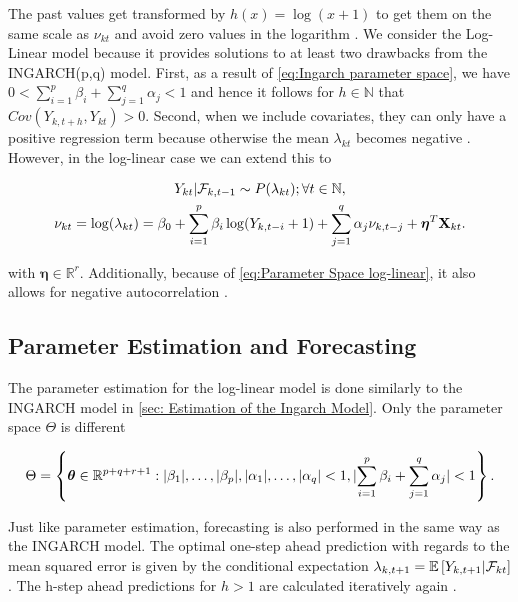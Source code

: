 The past values get transformed by $h(x)=\log(x+1)$ to get them on the same scale as $\nu_{kt}$ and avoid zero values in the logarithm \cite{Liboschik:2016,Fokianos:2011}. We consider the Log-Linear model because it provides solutions to at least two drawbacks from the INGARCH(p,q) model. First, as a result of \ref{eq:Ingarch parameter space}, we have $0 < \sum_{i=1}^p\beta_i + \sum_{j=1}^q\alpha_j < 1$ and hence it follows for $h\in \mathbb{N}$ that $Cov(Y_{k,t+h},Y_{kt})>0$. Second, when we include covariates, they can only have a positive regression term because otherwise the mean $\lambda_{kt}$ becomes negative \cite{Fokianos:2011}. However, in the log-linear case we can extend this to

\begin{gather}
Y_{kt} | \mathcal{F}_{k,t-1} \sim P(\lambda_{kt}); \forall t \in \mathbb{N}, \\
\nu_{kt}= \log(\lambda_{kt}) = \beta_0 + \sum_{i=1}^p\beta_i \log(Y_{k,t-i}+1) + \sum_{j=1}^q\alpha_j \nu_{k,t-j} + \bm{\eta}^T\textbf{X}_{kt}.
\label{eq:Log-Linear model external factors}
\end{gather}

with $\bm{\eta} \in \mathbb{R}^r$. Additionally, because of \ref{eq:Parameter Space log-linear}, it also allows for negative autocorrelation \cite{Liboschik:2016}. 

\subsection{Parameter Estimation and Forecasting}
\label{sec: Log-Linear Parameter Estimation and Forecasting}

The parameter estimation for the log-linear model is done similarly to the INGARCH model in \ref{sec: Estimation of the Ingarch Model}. Only the parameter space $\Theta$ is different

\begin{equation}
\Theta = \left\{ \bm{\theta} \in \mathbb{R}^{p+q+r+1}: \lvert\beta_1\rvert,\ldots,\lvert\beta_p\rvert,\lvert\alpha_1\rvert,\ldots,\lvert\alpha_q\rvert < 1, \lvert\sum_{i=1}^p\beta_i + \sum_{j=1}^q\alpha_j \rvert < 1 \right\}.
\label{eq:Parameter Space log-linear}
\end{equation}

Just like parameter estimation, forecasting is also performed in the same way as the INGARCH model. The optimal one-step ahead prediction with regards to the mean squared error is given by the conditional expectation $\lambda_{k,t+1}=\mathbb{E}\left[Y_{k,t+1} | \mathcal{F}_{kt} \right]$. The h-step ahead predictions for $h>1$ are calculated iteratively again \cite{Liboschik:2016}. 

